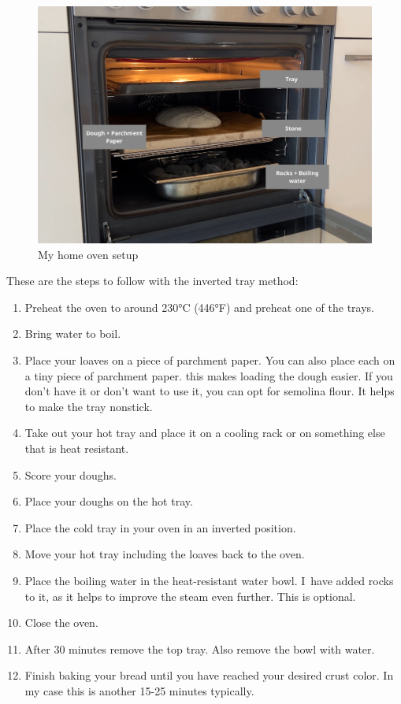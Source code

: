 \begin{figure}[!htb]
  \includegraphics[width=\textwidth]{baking-example.jpg}
  \caption{My home oven setup}
\end{figure}

These are the steps to follow with the inverted tray method:
\begin{enumerate}
\item Preheat the oven to around 230°C (446°F) and
preheat one of the trays.
\item Bring water to boil.
\item Place your loaves on a piece of parchment paper. You
can also place each on a tiny piece of parchment paper.
this makes loading the dough easier. If you don't
have it or don't want to use it, you can opt for
semolina flour. It helps to make the tray nonstick.
\item Take out your hot tray and place it
on a cooling rack or on something else that
is heat resistant.
\item Score your doughs.
\item Place your doughs on the hot tray.
\item Place the cold tray in your oven in an inverted position.
\item Move your hot tray including the loaves back
to the oven.
\item Place the boiling water in the heat-resistant
water bowl. I~have added rocks to it, as it helps
to improve the steam even further. This is optional.
\item Close the oven.
\item After 30 minutes remove the top tray. Also remove the bowl with water.
\item Finish baking your bread until you have reached your desired
crust color. In my case this is another 15-25 minutes typically.
\end{enumerate}

